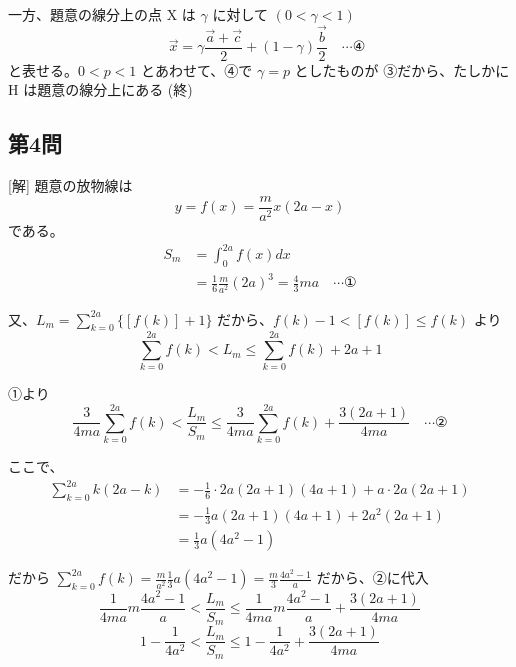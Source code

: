 \documentclass[../main.tex]{subfiles}
\begin{document}
一方、題意の線分上の点 $\text{X}$ は $\gamma$ に対して $(0 < \gamma < 1)$
\[
  \quad \vec{x} = \gamma \frac{\vec{a}+\vec{c}}{2} + (1-\gamma) \frac{\vec{b}}{2} \quad \cdots \text{④}
\]
と表せる。$0 < p < 1$ とあわせて、④で $\gamma = p$ としたものが ③だから、たしかに\\
$\text{H}$ は題意の線分上にある (終)

\subsection*{第4問}
[解] 題意の放物線は
\[
  y = f(x) = \frac{m}{a^2}x(2a-x)
\]
である。
\begin{align*}
  S_m &= \int_0^{2a} f(x) dx \\
  &= \frac{1}{6} \frac{m}{a^2} (2a)^3 = \frac{4}{3}ma \quad \cdots \text{①}
\end{align*}

\begin{center}
\end{center}

又、$L_m = \sum_{k=0}^{2a} \{ [f(k)] + 1 \}$ だから、$f(k)-1 < [f(k)] \le f(k)$ より
\[
  \sum_{k=0}^{2a} f(k) < L_m \le \sum_{k=0}^{2a} f(k) + 2a + 1
\]

①より
\[
  \frac{3}{4ma} \sum_{k=0}^{2a} f(k) < \frac{L_m}{S_m} \le \frac{3}{4ma} \sum_{k=0}^{2a} f(k) + \frac{3(2a+1)}{4ma} \quad \cdots \text{②}
\]

ここで、
\begin{align*}
  \sum_{k=0}^{2a} k(2a-k) &= -\frac{1}{6} \cdot 2a(2a+1)(4a+1) + a \cdot 2a(2a+1) \\
  &= -\frac{1}{3}a(2a+1)(4a+1) + 2a^2(2a+1) \\
  &= \frac{1}{3}a(4a^2-1)
\end{align*}

だから $\sum_{k=0}^{2a} f(k) = \frac{m}{a^2} \frac{1}{3}a(4a^2-1) = \frac{m}{3} \frac{4a^2-1}{a}$ だから、②に代入
\[
  \frac{1}{4ma} m \frac{4a^2-1}{a} < \frac{L_m}{S_m} \le \frac{1}{4ma} m \frac{4a^2-1}{a} + \frac{3(2a+1)}{4ma}
\]
\[
  1 - \frac{1}{4a^2} < \frac{L_m}{S_m} \le 1 - \frac{1}{4a^2} + \frac{3(2a+1)}{4ma}
\]
\end{document}
